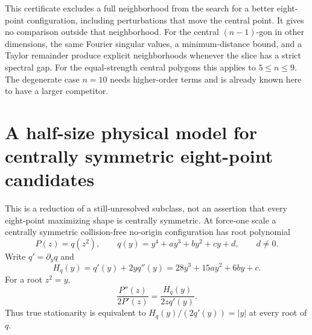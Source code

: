 \documentclass[11pt]{article}
\theoremstyle{remark}
\numberwithin{equation}{section}
\begin{document}
This certificate excludes a full neighborhood from the search for a
better eight-point configuration, including perturbations that move
the central point. It gives no comparison outside that neighborhood.
For the central $(n-1)$-gon in other dimensions, the same Fourier
singular values, a minimum-distance bound, and a Taylor remainder
produce explicit neighborhoods whenever the slice has a strict
spectral gap. For the equal-strength central polygons this applies
to $5\le n\le9$. The degenerate case $n=10$ needs higher-order terms
and is already known here to have a larger competitor.

\section{A half-size physical model for centrally symmetric eight-point candidates}
\label{sec:n8-even-half-model}

This is a reduction of a still-unresolved subclass, not an assertion
that every eight-point maximizing shape is centrally symmetric.
At force-one scale a centrally symmetric collision-free no-origin
configuration has root polynomial
\[
 P(z)=q(z^2),\qquad q(y)=y^4+ay^3+by^2+cy+d,\qquad d\ne0.
\]
Write $q'=\partial_yq$ and
\[
 H_q(y)=q'(y)+2yq''(y)=28y^3+15ay^2+6by+c.
\]
For a root $z^2=y$,
\[
 \frac{P''(z)}{2P'(z)}=\frac{H_q(y)}{2zq'(y)}.
\]
Thus true stationarity is equivalent to
$H_q(y)/(2q'(y))=|y|$ at every root of $q$.
\end{document}
